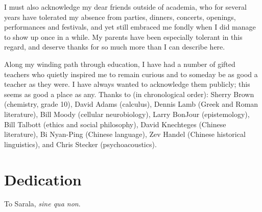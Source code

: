 \begin{spacing}{2}
I must also acknowledge my dear friends outside of academia, who for several years have tolerated my absence from parties, dinners, concerts, openings, performances and festivals, and yet still embraced me fondly when I did manage to show up once in a while.  My parents have been especially tolerant in this regard, and deserve thanks for so much more than I can describe here.

Along my winding path through education, I have had a number of gifted teachers who quietly inspired me to remain curious and to someday be as good a teacher as they were.  I have always wanted to acknowledge them publicly; this seems as good a place as any.  Thanks to (in chronological order): Sherry Brown (chemistry, grade 10), David Adams (calculus), Dennis Lamb (Greek and Roman literature), Bill Moody (cellular neurobiology), Larry BonJour (epistemology), Bill Talbott (ethics and social philosophy), David Knechteges (Chinese literature), Bi Nyan-Ping (Chinese language), Zev Handel (Chinese historical linguistics), and Chris Stecker (psychoacoustics).
\newpage

\chapter*{Dedication}
To Sarala, \textit{sine qua non}.
\end{spacing}
